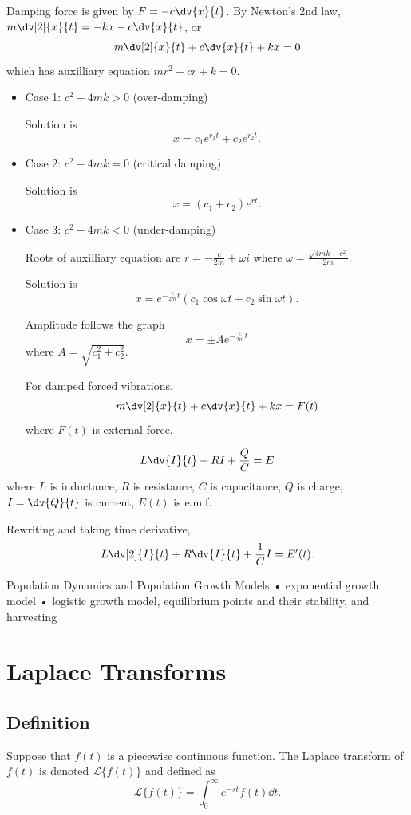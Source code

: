 \begin{example}
Damping force is given by $F=-c\dv{x}{t}$. By Newton's 2nd law, $m\dv[2]{x}{t}=-kx-c\dv{x}{t}$, or
\[ m\dv[2]{x}{t}+c\dv{x}{t}+kx=0 \]
which has auxilliary equation $mr^2+cr+k=0$.
\begin{itemize}
\item Case 1: $c^2-4mk>0$ (over-damping)

Solution is
\[ x=c_1e^{r_1t}+c_2e^{r_2t}. \]

\item Case 2: $c^2-4mk=0$ (critical damping)

Solution is
\[ x=(c_1+c_2)e^{rt}. \]

\item Case 3: $c^2-4mk<0$ (under-damping)

Roots of auxilliary equation are $r=-\frac{c}{2m}\pm\omega i$ where $\omega=\frac{\sqrt{4mk-c^2}}{2m}$.

Solution is
\[ x=e^{-\frac{c}{2m}t}(c_1\cos\omega t+c_2\sin\omega t). \]

Amplitude follows the graph
\[ x=\pm Ae^{-\frac{c}{2m}t} \]
where $A=\sqrt{c_1^2+c_2^2}$.

For damped forced vibrations,
\[ m\dv[2]{x}{t}+c\dv{x}{t}+kx=F(t) \]
where $F(t)$ is external force.
\end{itemize}

\end{example}

\begin{example}
\[ L\dv{I}{t}+RI+\frac{Q}{C}=E \]
where $L$ is inductance, $R$ is resistance, $C$ is capacitance, $Q$ is charge, $I=\dv{Q}{t}$ is current, $E(t)$ is e.m.f.

Rewriting and taking time derivative,
\[ L\dv[2]{I}{t}+R\dv{I}{t}+\frac{1}{C}I=E^\prime(t). \]
\end{example}



Population Dynamics and Population Growth Models
• exponential growth model
• logistic growth model, equilibrium points and
their stability, and harvesting

\section{Laplace Transforms}
\subsection{Definition}
\begin{definition}
Suppose that $f(t)$ is a piecewise continuous function. The Laplace transform of $f(t)$ is denoted $\mathcal{L}\{f(t)\}$ and defined as
\begin{equation}
\mathcal{L}\{f(t)\}=\int_0^\infty e^{-st}f(t)\dd{t}.
\end{equation}
\end{definition}

